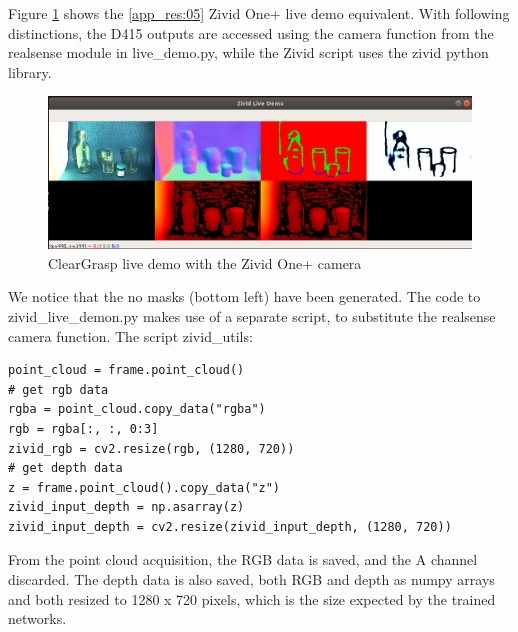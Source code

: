 


Figure \ref{fig:ZividLiveDemo} shows the \ref{app_res:05} Zivid One+ live demo equivalent. With following distinctions, the D415 outputs are accessed using the camera function from the realsense module in live\_demo.py, while the Zivid script uses the zivid python library.



\begin{figure}[h!]
\centering
\includegraphics[width=\textwidth]{Figures/ZividLiveDemo.png}
\caption{ClearGrasp live demo with the Zivid One+ camera}
\label{fig:ZividLiveDemo}
\end{figure}

We notice that the no masks (bottom left) have been generated. The code to zivid\_live\_demon.py makes use of a separate script, to substitute the realsense camera function. The script zivid\_utils:
\begin{verbatim}
point_cloud = frame.point_cloud()
# get rgb data
rgba = point_cloud.copy_data("rgba")
rgb = rgba[:, :, 0:3]
zivid_rgb = cv2.resize(rgb, (1280, 720))
# get depth data
z = frame.point_cloud().copy_data("z")
zivid_input_depth = np.asarray(z)
zivid_input_depth = cv2.resize(zivid_input_depth, (1280, 720))
\end{verbatim}
From the point cloud acquisition, the RGB data is saved, and the A channel discarded. The depth data is also saved, both RGB and depth as numpy arrays and both resized to 1280 x 720 pixels, which is the size expected by the trained networks.

